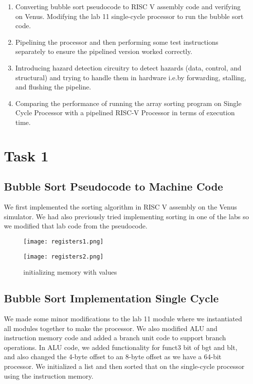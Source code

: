 \documentclass[12pt]{article}
\begin{document}
\begin{enumerate}
    \item Converting bubble sort pseudocode to RISC V assembly code and verifying on Venus. Modifying the lab 11 single-cycle processor to run the bubble sort code.
    \item Pipelining the processor and then performing some test instructions separately to ensure the pipelined version worked correctly.
    \item Introducing hazard detection circuitry to detect hazards (data, control, and structural) and trying to handle them in hardware i.e.by forwarding, stalling, and flushing the pipeline.
    \item Comparing the performance of running the array sorting program on Single Cycle Processor with a pipelined RISC-V Processor in terms of execution time.
    
\end{enumerate}

\section{Task 1}\label{task1}
    \subsection{Bubble Sort Pseudocode to Machine Code}\label{task1-0}
        We first implemented the sorting algorithm in RISC V assembly on the Venus simulator. We had also previously tried implementing sorting in one of the labs so we modified that lab code from the pseudocode. 
        
        \begin{figure}[htbp!]
            \centering
            \texttt{[image: registers1.png]}
        \end{figure}
        \begin{figure}[htbp!]
            \centering
            \texttt{[image: registers2.png]}
            \caption{initializing memory with values}
        \end{figure}
        
\newpage

    \subsection{Bubble Sort Implementation Single Cycle}\label{task1-1}
        We made some minor modifications to the lab 11 module where we instantiated all modules together to make the processor. We also modified ALU and instruction memory code and added a branch unit code to support branch operations. In ALU code, we added functionality for funct3 bit of bgt and blt, and also changed the 4-byte offset to an 8-byte offset as we have a 64-bit processor. We initialized a list and then sorted that on the single-cycle processor using the instruction memory. 
\end{document}
